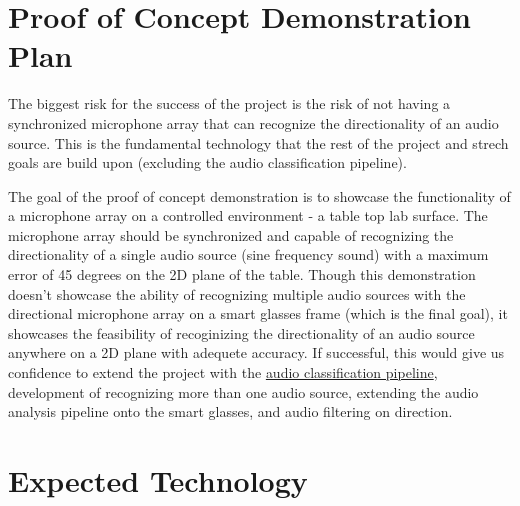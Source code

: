 \documentclass{article}
\begin{document}
\section{Proof of Concept Demonstration Plan}


\hspace{1cm}

The biggest risk for the success of the project is the risk of not having a synchronized microphone array that can recognize the directionality of an audio source.
This is the fundamental technology that the rest of the project and strech goals are build upon (excluding the audio classification pipeline).

The goal of the proof of concept demonstration is to showcase the functionality of a microphone array on a controlled environment - a table top lab surface.
The microphone array should be synchronized and capable of recognizing the directionality of a single audio source (sine frequency sound) with a maximum error of 45 degrees on the 2D plane of the table.
Though this demonstration doesn't showcase the ability of recognizing multiple audio sources with the directional microphone array on a smart glasses frame (which is the final goal), it showcases the feasibility of recoginizing the directionality of an audio source anywhere on a 2D plane with adequete accuracy.
If successful, this would give us confidence to extend the project with the \hyperlink{audio_classification_pipeline}{audio classification pipeline}, development of recognizing more than one audio source, extending the audio analysis pipeline onto the smart glasses, and audio filtering on direction. 

\section{Expected Technology}

\end{document}

